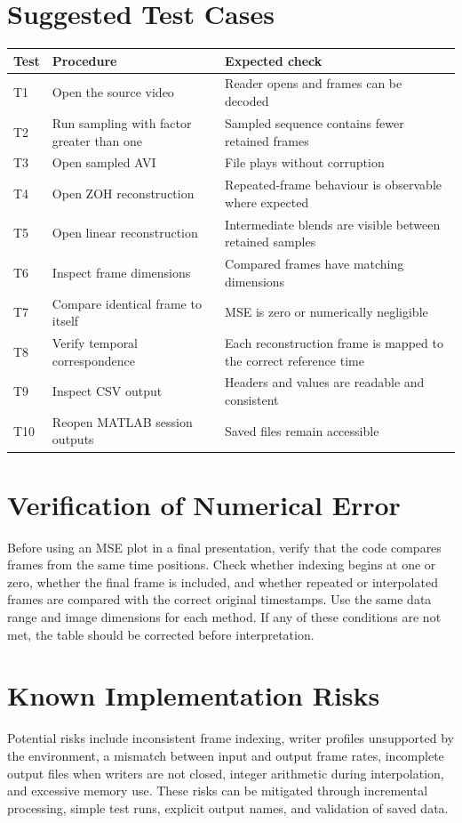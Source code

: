 \documentclass[12pt,a4paper,oneside]{report}
\begin{document}
\section{Suggested Test Cases}
\begin{longtable}{p{}p{}p{}}
\toprule
\textbf{Test} & \textbf{Procedure} & \textbf{Expected check}\\
\midrule
T1 & Open the source video & Reader opens and frames can be decoded\\
T2 & Run sampling with factor greater than one & Sampled sequence contains fewer retained frames\\
T3 & Open sampled AVI & File plays without corruption\\
T4 & Open ZOH reconstruction & Repeated-frame behaviour is observable where expected\\
T5 & Open linear reconstruction & Intermediate blends are visible between retained samples\\
T6 & Inspect frame dimensions & Compared frames have matching dimensions\\
T7 & Compare identical frame to itself & MSE is zero or numerically negligible\\
T8 & Verify temporal correspondence & Each reconstruction frame is mapped to the correct reference time\\
T9 & Inspect CSV output & Headers and values are readable and consistent\\
T10 & Reopen MATLAB session outputs & Saved files remain accessible\\
\bottomrule
\end{longtable}

\section{Verification of Numerical Error}
Before using an MSE plot in a final presentation, verify that the code compares frames from the same time positions. Check whether indexing begins at one or zero, whether the final frame is included, and whether repeated or interpolated frames are compared with the correct original timestamps. Use the same data range and image dimensions for each method. If any of these conditions are not met, the table should be corrected before interpretation.

\section{Known Implementation Risks}
Potential risks include inconsistent frame indexing, writer profiles unsupported by the environment, a mismatch between input and output frame rates, incomplete output files when writers are not closed, integer arithmetic during interpolation, and excessive memory use. These risks can be mitigated through incremental processing, simple test runs, explicit output names, and validation of saved data.
\end{document}
